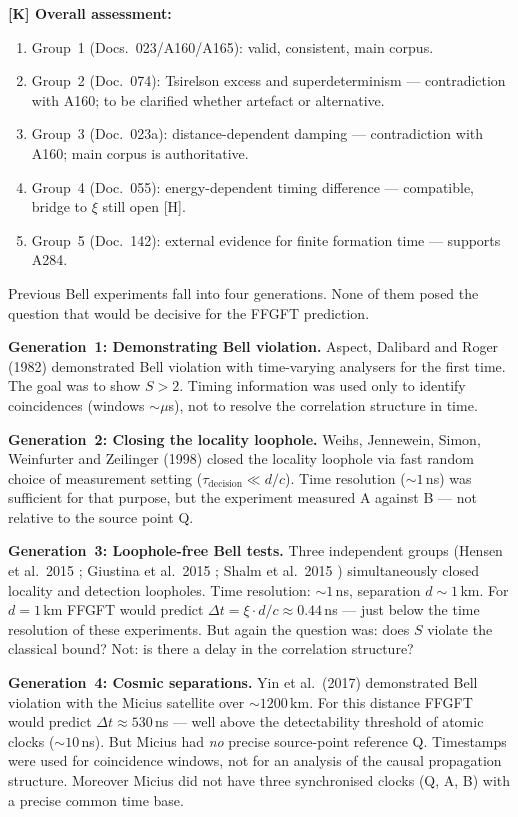 \textbf{[K] Overall assessment:}
\begin{enumerate}[leftmargin=1.6em,itemsep=0.2em]
  \item Group~1 (Docs.~023/A160/A165): valid, consistent, main corpus.
  \item Group~2 (Doc.~074): Tsirelson excess and superdeterminism ---
    contradiction with A160; to be clarified whether artefact or alternative.
  \item Group~3 (Doc.~023a): distance-dependent damping --- contradiction
    with A160; main corpus is authoritative.
  \item Group~4 (Doc.~055): energy-dependent timing difference ---
    compatible, bridge to $\xi$ still open [H].
  \item Group~5 (Doc.~142): external evidence for finite formation time ---
    supports A284.
\end{enumerate}

Previous Bell experiments fall into four generations.
None of them posed the question that would be decisive for the FFGFT prediction.

\textbf{Generation~1: Demonstrating Bell violation.}
Aspect, Dalibard and Roger (1982) \cite{Aspect1982} demonstrated Bell violation
with time-varying analysers for the first time. The goal was to show $S > 2$.
Timing information was used only to identify coincidences (windows $\sim \mu$s),
not to resolve the correlation structure in time.

\textbf{Generation~2: Closing the locality loophole.}
Weihs, Jennewein, Simon, Weinfurter and Zeilinger (1998) \cite{Weihs1998}
closed the locality loophole via fast random choice of measurement setting
($\tau_\text{decision} \ll d/c$). Time resolution ($\sim 1$\,ns) was
sufficient for that purpose, but the experiment measured A against B ---
not relative to the source point Q.

\textbf{Generation~3: Loophole-free Bell tests.}
Three independent groups (Hensen et al.\ 2015 \cite{Hensen2015};
Giustina et al.\ 2015 \cite{Giustina2015}; Shalm et al.\ 2015 \cite{Shalm2015})
simultaneously closed locality and detection loopholes.
Time resolution: $\sim 1$\,ns, separation $d \sim 1$\,km.
For $d = 1$\,km FFGFT would predict $\Delta t = \xi \cdot d/c \approx 0{.}44$\,ns
--- just below the time resolution of these experiments.
But again the question was: does $S$ violate the classical bound?
Not: is there a delay in the correlation structure?

\textbf{Generation~4: Cosmic separations.}
Yin et al.\ (2017) \cite{Yin2017} demonstrated Bell violation with the Micius
satellite over $\sim 1200$\,km. For this distance FFGFT would predict
$\Delta t \approx 530$\,ns --- well above the detectability threshold of
atomic clocks ($\sim 10$\,ns). But Micius had \emph{no} precise source-point
reference Q. Timestamps were used for coincidence windows, not for an
analysis of the causal propagation structure. Moreover Micius did not have
three synchronised clocks (Q, A, B) with a precise common time base.

